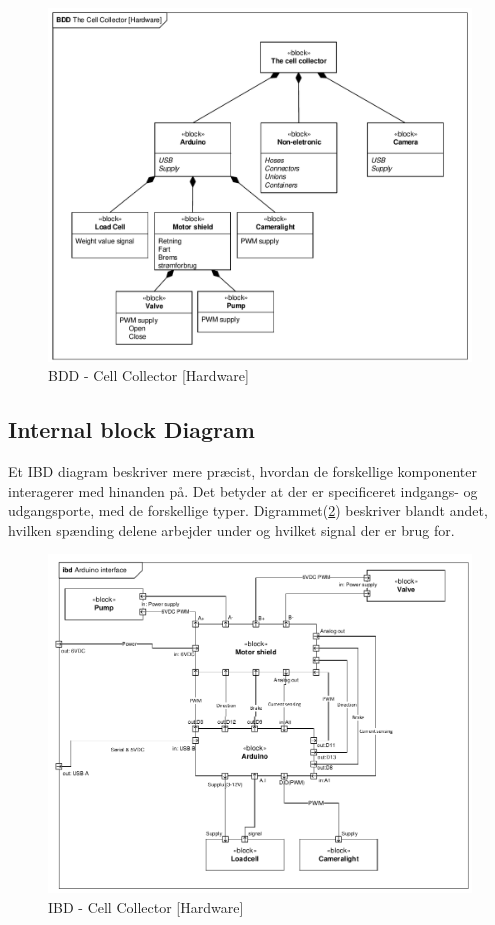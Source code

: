 \begin{figure}[H]
	\centering
	\includegraphics[width=1\textwidth]{pdf/BDD_Hardware_4315_cropped.pdf}
	\caption{BDD - Cell Collector [Hardware]}
	\label{fig:bdd_Hardware}
\end{figure}

\newpage
\subsection{Internal block Diagram} 
Et IBD diagram beskriver mere præcist, hvordan de forskellige komponenter interagerer med hinanden på. Det betyder at der er specificeret indgangs- og udgangsporte, med de forskellige typer. Digrammet(\ref{fig:ibd_Hardware}) beskriver blandt andet, hvilken spænding delene arbejder under og hvilket signal der er brug for.


\begin{figure}[H]
	\centering
	\includegraphics[width=1\textwidth]{pdf/IBD_Hardware(Arduino)_cropped.pdf}
	\caption{IBD - Cell Collector [Hardware]}
	\label{fig:ibd_Hardware}
\end{figure}

